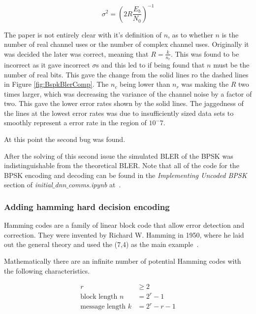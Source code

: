 \documentclass[12pt,onecolumn,letterpaper]{article}
\newcommand{\code}{\textit}
\begin{document}
\begin{equation}
   \sigma^2 = \left(2R\frac{E_b}{N_0} \right)^{-1}
   \label{eq:SigmaFromEbN0}
\end{equation}

The paper is not entirely clear with it's definition of $n$, as to whether $n$ is the number of real channel uses or the number of complex channel uses. Originally it was decided the later was correct, meaning that $R = \frac{k}{n_c}$. This was found to be incorrect as it gave incorrect $\sigma$s and this led to if being found that $n$ must be the number of real bits. This gave the change from the solid lines ro the dashed lines in Figure \ref{fig:BspkBlerComp}. The $n_c$ being lower than $n_r$ was making the $R$ two times larger, which was decreasing the variance of the channel noise by a factor of two. This gave the lower error rates shown by the solid lines. The jaggedness of the lines at the lowest error rates was due to insufficiently sized data sets to smoothly represent a error rate in the region of $10^-7$.

At this point the second bug was found.


After the solving of this second issue the simulated BLER of the BPSK was indistinguishable from the theoretical BLER. Note that all of the code for the BPSK encoding and decoding can be found in the \textit{Implementing Uncoded BPSK} section of \code{initial$\_$dnn$\_$comms.ipynb} at~\cite{AwGithub}.

\subsubsection{Adding hamming hard decision encoding}

Hamming codes are a family of linear block code that allow error detection and correction. They were invented by Richard W. Hamming in 1950, where he laid out the general theory and used the (7,4) as the main example~\cite{HammingOriginalPaper}.

Mathematically there are an infinite number of potential Hamming codes with the following characteristics.

\begin{align}
   r &\geq 2 \\
   \mbox{block length } n &= 2^r - 1 \\
   \mbox{message length } k &= 2^r -r -1
   \label{eq:GeneralHamming}
\end{align}
\end{document}
